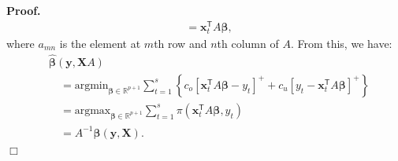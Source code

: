 \documentclass{article}
\newenvironment{proof}
 {\begin{trivlist} \item[] {\bf Proof.\ }}{\hfill$\Box$ \end{trivlist}}
\begin{document}
\begin{proof}
\[\begin{aligned}
            &=\mathbf{x}_t^{\mathsf{T}}A\boldsymbol{\beta},
        \end{aligned}
    \]
    where $a_{mn}$ is the element at $m$th row and $n$th column of $A$.
    From this, we have:
    \[
        \begin{aligned}
            &\hat{\boldsymbol{\beta}}(\mathbf{y},\mathbf{X}A)\\
            &\quad=\text{argmin}_{\boldsymbol{\beta}\in \mathbb{R}^{p+1}}\displaystyle\sum_{t=1}^s{\left\{c_o\left[\mathbf{x}_t^{\mathsf{T}}A\boldsymbol{\beta}-y_t\right]^{+}+c_u\left[y_t-\mathbf{x}_t^{\mathsf{T}}A\boldsymbol{\beta}\right]^{+}\right\}}\\
            &\quad=\text{argmax}_{\boldsymbol{\beta}\in \mathbb{R}^{p+1}}\displaystyle\sum_{t=1}^s{\pi(\mathbf{x}_t^{\mathsf{T}}A\boldsymbol{\beta},y_t)}\\
            &\quad=A^{-1}\hat{\boldsymbol{\beta}}(\mathbf{y},\mathbf{X}).
        \end{aligned}
    \]
\end{proof}
\end{document}
